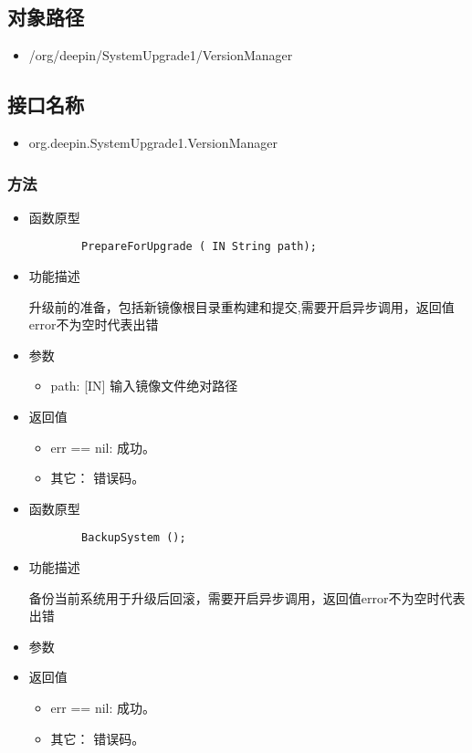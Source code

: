 \documentclass{utart}
\begin{document}
\subsection{对象路径}
\begin{itemize}
    \item /org/deepin/SystemUpgrade1/VersionManager
\end{itemize}

\subsection{接口名称}
\begin{itemize}
    \item org.deepin.SystemUpgrade1.VersionManager
\end{itemize}

\subsubsection{方法}
\begin{itemize}
    \item 函数原型
    
    \begin{verbatim}
        PrepareForUpgrade ( IN String path);
      \end{verbatim}
    \item 功能描述
    
    升级前的准备，包括新镜像根目录重构建和提交,需要开启异步调用，返回值error不为空时代表出错
    \item 参数
      \begin{itemize}
          \item path: [IN] 输入镜像文件绝对路径
      \end{itemize}
    \item 返回值
      \begin{itemize}
          \item err == nil: 成功。
          \item 其它： 错误码。
      \end{itemize}
\end{itemize}

\begin{itemize}
    \item 函数原型
    
    \begin{verbatim}
        BackupSystem ();
      \end{verbatim}
    \item 功能描述
    
    备份当前系统用于升级后回滚，需要开启异步调用，返回值error不为空时代表出错
    \item 参数
      \begin{itemize}
      \end{itemize}
    \item 返回值
      \begin{itemize}
          \item err == nil: 成功。
          \item 其它： 错误码。
      \end{itemize}
\end{itemize}
\end{document}
